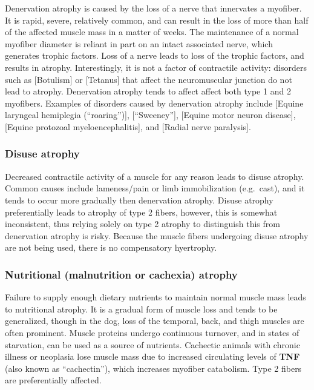 \documentclass[openany]{book}
\begin{document}
Denervation atrophy is caused by the loss of a nerve that innervates a
myofiber. It is rapid, severe, relatively common, and can result in the
loss of more than half of the affected muscle mass in a matter of weeks.
The maintenance of a normal myofiber diameter is reliant in part on an
intact associated nerve, which generates trophic factors. Loss of a
nerve leads to loss of the trophic factors, and results in atrophy.
Interestingly, it is not a factor of contractile activity: disorders
such as {[}Botulism{]} or {[}Tetanus{]} that affect the neuromuscular
junction do not lead to atrophy. Denervation atrophy tends to affect
affect both type 1 and 2 myofibers. Examples of disorders caused by
denervation atrophy include {[}Equine laryngeal hemiplegia
(``roaring''){]}, {[}``Sweeney''{]}, {[}Equine motor neuron disease{]},
{[}Equine protozoal myeloencephalitis{]}, and {[}Radial nerve
paralysis{]}.

\subsubsection{Disuse atrophy}\label{disuse-atrophy}

Decreased contractile activity of a muscle for any reason leads to
disuse atrophy. Common causes include lameness/pain or limb
immobilization (e.g.~cast), and it tends to occur more gradually then
denervation atrophy. Disuse atrophy preferentially leads to atrophy of
type 2 fibers, however, this is somewhat inconsistent, thus relying
solely on type 2 atrophy to distinguish this from denervation atrophy is
risky. Because the muscle fibers undergoing disuse atrophy are not being
used, there is no compensatory hyertrophy.

\subsubsection{Nutritional (malnutrition or cachexia)
atrophy}\label{nutritional-malnutrition-or-cachexia-atrophy}

Failure to supply enough dietary nutrients to maintain normal muscle
mass leads to nutritional atrophy. It is a gradual form of muscle loss
and tends to be generalized, though in the dog, loss of the temporal,
back, and thigh muscles are often prominent. Muscle proteins undergo
continuous turnover, and in states of starvation, can be used as a
source of nutrients. Cachectic animals with chronic illness or neoplasia
lose muscle mass due to increased circulating levels of \textbf{TNF}
(also known as ``cachectin''), which increases myofiber catabolism. Type
2 fibers are preferentially affected.
\end{document}
